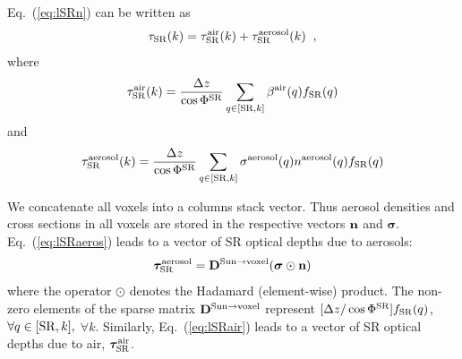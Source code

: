 \documentclass[10pt,twocolumn,letterpaper]{article}
\newcommand{\vect}[1]{\bm{#1}}
\begin{document}
Eq.~(\ref{eq:lSRn}) can be written as
\begin{equation}
  \tau_{\rm SR}(k)=
   \tau_{\rm SR}^{\rm air}(k) +  \tau_{\rm SR}^{\rm aerosol}(k)
  \;\;,
  \label{eq:lSRaa}
\end{equation}
where
\begin{equation}
  \tau_{\rm SR}^{\rm air}(k)=\frac{\Delta z}{\cos\Phi^{\rm SR}}
     \sum_{q \in[{\rm SR},k]}
     \beta^{\rm air}(q)  f_{\rm SR}(q)
  \label{eq:lSRair}
\end{equation}
and
\begin{equation}
  \tau_{\rm SR}^{\rm aerosol}(k)=\frac{\Delta z}{\cos\Phi^{\rm SR}}
     \sum_{q \in[{\rm SR},k]}
     \sigma^{\rm aerosol}(q) n^{\rm aerosol}(q) f_{\rm SR}(q)
  \label{eq:lSRaeros}
\end{equation}


We concatenate all voxels into a columns stack vector. Thus
aerosol densities and cross sections in all voxels are stored in the respective vectors
${\bf n}$ and $\vect{\sigma}$.
Eq.~(\ref{eq:lSRaeros}) leads to a vector of SR optical depths due to aerosols:
\begin{equation}
  \vect{\tau}_{\rm SR}^{\rm aerosol}=
  {\bf D}^{\mathrm{Sun \rightarrow voxel}}
     (\vect{\sigma} \odot {\bf n})
  \label{eq:tauSRvec1}
\end{equation}
where the operator $\odot$ denotes the Hadamard (element-wise)
product. The non-zero elements of the sparse matrix ${\bf D}^{\mathrm{Sun \rightarrow voxel}}$
represent $[\Delta z/\cos\Phi^{\rm SR}]f_{\rm SR}(q)$, \mbox{$\forall q \in[{\rm SR},k],$} $\forall k$.
Similarly, Eq.~(\ref{eq:lSRair}) leads to a vector of SR optical depths due to air,
$\vect{\tau}_{\rm SR}^{\rm air}$.
\end{document}
